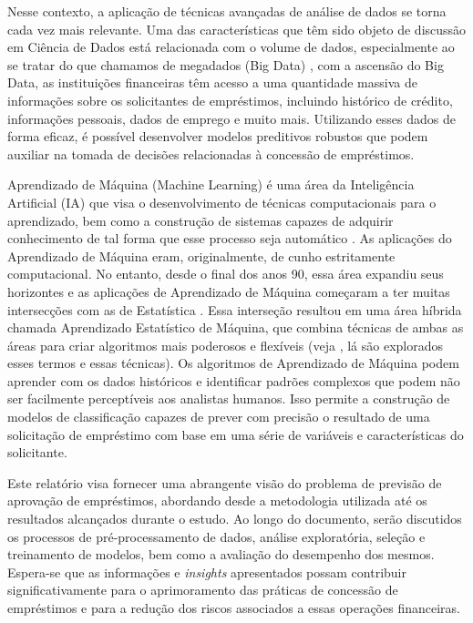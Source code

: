 \documentclass[a4paper,12pt]{article} %
\begin{document}
Nesse contexto, a aplicação de técnicas avançadas de análise de dados se torna cada vez mais relevante. Uma das características que têm sido objeto de discussão em Ciência de Dados está relacionada com o volume de dados, especialmente ao se tratar do que chamamos de megadados (Big Data) \cite{morettin2021estatistica}, com a ascensão do Big Data, as instituições financeiras têm acesso a uma quantidade massiva de informações sobre os solicitantes de empréstimos, incluindo histórico de crédito, informações pessoais, dados de emprego e muito mais. Utilizando esses dados de forma eficaz, é possível desenvolver modelos preditivos robustos que podem auxiliar na tomada de decisões relacionadas à concessão de empréstimos.

Aprendizado de Máquina (Machine Learning) é uma área da Inteligência Artificial (IA) que visa o desenvolvimento de técnicas computacionais para o aprendizado, bem como a construção de sistemas capazes de adquirir conhecimento de tal forma que esse processo seja automático \cite{monard2003conceitos}. As aplicações do Aprendizado de Máquina eram, originalmente, de cunho estritamente computacional. No entanto, desde o final dos anos 90, essa área expandiu seus horizontes e as aplicações de Aprendizado de Máquina começaram a ter muitas intersecções com as de Estatística \cite{izbicki2020aprendizado}. Essa interseção resultou em uma área híbrida chamada Aprendizado Estatístico de Máquina, que combina técnicas de ambas as áreas para criar algoritmos mais poderosos e flexíveis (veja \cite{morettin2021estatistica}, lá são explorados esses termos e essas técnicas). Os algoritmos de Aprendizado de Máquina podem aprender com os dados históricos e identificar padrões complexos que podem não ser facilmente perceptíveis aos analistas humanos. Isso permite a construção de modelos de classificação capazes de prever com precisão o resultado de uma solicitação de empréstimo com base em uma série de variáveis e características do solicitante.

Este relatório visa fornecer uma abrangente visão do problema de previsão de aprovação de empréstimos, abordando desde a metodologia utilizada até os resultados alcançados durante o estudo. Ao longo do documento, serão discutidos os processos de pré-processamento de dados, análise exploratória, seleção e treinamento de modelos, bem como a avaliação do desempenho dos mesmos. Espera-se que as informações e \textit{insights} apresentados possam contribuir significativamente para o aprimoramento das práticas de concessão de empréstimos e para a redução dos riscos associados a essas operações financeiras.
\end{document}
